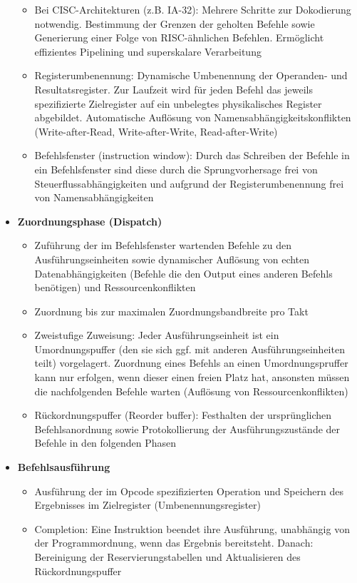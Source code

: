 \begin{itemize}
\begin{itemize}
					\item Bei CISC-Architekturen (z.B. IA-32): Mehrere Schritte zur Dokodierung notwendig. Bestimmung der Grenzen der geholten Befehle sowie Generierung einer Folge von RISC-ähnlichen Befehlen. Ermöglicht effizientes Pipelining und superskalare Verarbeitung
					\item Registerumbenennung: Dynamische Umbenennung der Operanden- und Resultatsregister. Zur Laufzeit wird für jeden Befehl das jeweils spezifizierte Zielregister auf ein unbelegtes physikalisches Register abgebildet. Automatische Auflösung von Namensabhängigkeitskonflikten (Write-after-Read, Write-after-Write, Read-after-Write)
					\item Befehlsfenster (instruction window): Durch das Schreiben der Befehle in ein Befehlsfenster sind diese durch die Sprungvorhersage frei von Steuerflussabhängigkeiten und aufgrund der Registerumbenennung frei von Namensabhängigkeiten
				\end{itemize}
				\item \textbf{Zuordnungsphase (Dispatch)}
				\begin{itemize}
					\item Zuführung der im Befehlsfenster wartenden Befehle zu den Ausführungseinheiten sowie dynamischer Auflösung von echten Datenabhängigkeiten (Befehle die den Output eines anderen Befehls benötigen) und Ressourcenkonflikten
					\item Zuordnung bis zur maximalen Zuordnungsbandbreite pro Takt
					\item Zweistufige Zuweisung: Jeder Ausführungseinheit ist ein Umordnungspuffer (den sie sich ggf. mit anderen Ausführungseinheiten teilt) vorgelagert. Zuordnung eines Befehls an einen Umordnungspruffer kann nur erfolgen, wenn dieser einen freien Platz hat, ansonsten müssen die nachfolgenden Befehle warten (Auflösung von Ressourcenkonflikten)
					\item Rückordnungspuffer (Reorder buffer): Festhalten der ursprünglichen Befehlsanordnung sowie Protokollierung der Ausführungszustände der Befehle in den folgenden Phasen
				\end{itemize}
				\item \textbf{Befehlsausführung}
				\begin{itemize}
					\item Ausführung der im Opcode spezifizierten Operation und Speichern des Ergebnisses im Zielregister (Umbenennungsregister)
					\item Completion: Eine Instruktion beendet ihre Ausführung, unabhängig von der Programmordnung, wenn das Ergebnis bereitsteht. Danach: Bereinigung der Reservierungstabellen und Aktualisieren des Rückordnungspuffer

\end{itemize}
\end{itemize}
